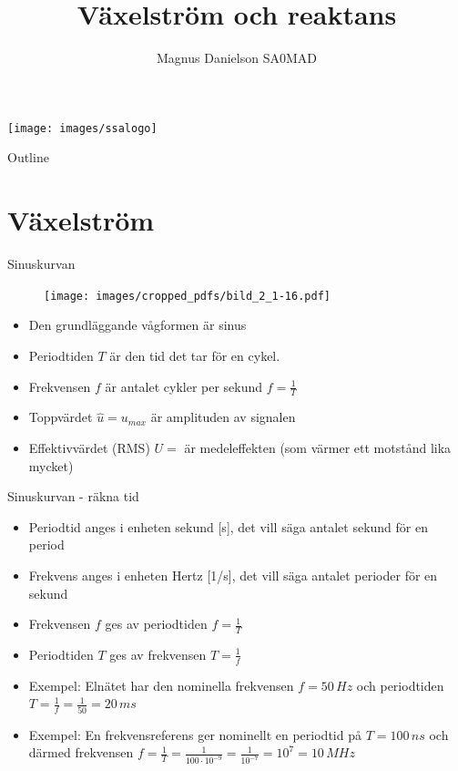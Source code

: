 \documentclass{beamer}
\title{Växelström och reaktans}
\author{Magnus Danielson SA0MAD}
\begin{document}
\begin{frame}
\titlepage
\texttt{[image: images/ssalogo]}
\end{frame}

\begin{frame}{Outline}
\tableofcontents
\end{frame}

\section{Växelström}

\begin{frame}{Sinuskurvan}

\begin{figure}[h]
\texttt{[image: images/cropped\_pdfs/bild\_2\_1-16.pdf]}
\label{fig:BildII1-16}
\end{figure}

\begin{itemize}
\item Den grundläggande vågformen är sinus
\item Periodtiden $T$ är den tid det tar för en cykel.
\item Frekvensen $f$ är antalet cykler per sekund $f=\frac{1}{T}$
\item Toppvärdet $\hat{u}=u_{max}$ är amplituden av signalen
  \item Effektivvärdet (RMS) $U = $ är medeleffekten (som värmer ett motstånd lika mycket)
\end{itemize}
\end{frame}

\begin{frame}{Sinuskurvan - räkna tid}
  \begin{itemize}
  \item Periodtid anges i enheten sekund [s], det vill säga antalet sekund för en period
  \item Frekvens anges i enheten Hertz [1/s], det vill säga antalet perioder för en sekund
  \item Frekvensen $f$ ges av periodtiden $f = \frac{1}{T}$
  \item Periodtiden $T$ ges av frekvensen $T = \frac{1}{f}$
  \item Exempel: Elnätet har den nominella frekvensen $f=50\,Hz$ och periodtiden $T=\frac{1}{f}=\frac{1}{50}=20\,ms$
  \item Exempel: En frekvensreferens ger nominellt en periodtid på $T=100\,ns$ och därmed frekvensen $f=\frac{1}{T}=\frac{1}{100\cdot10^{-9}}=\frac{1}{10^{-7}}=10^7=10\,MHz$
  \end{itemize}
\end{frame}
\end{document}
